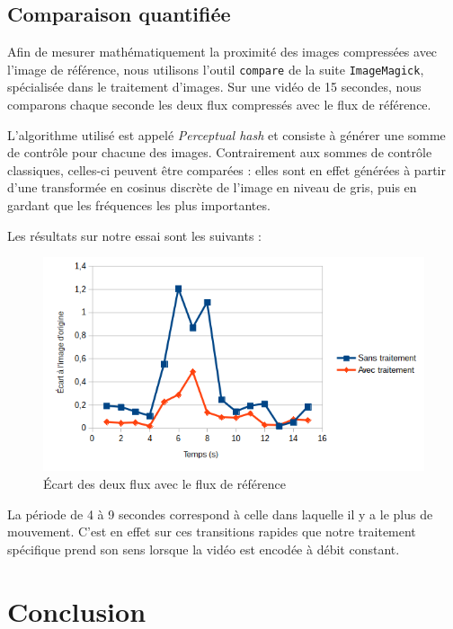 \documentclass[11pt,a4paper]{article}
\begin{document}
\subsection{Comparaison quantifiée}
Afin de mesurer mathématiquement la proximité des images compressées avec l'image de référence, nous utilisons l'outil \texttt{compare} de la suite \texttt{ImageMagick}, spécialisée dans le traitement d'images.
Sur une vidéo de 15 secondes, nous comparons chaque seconde les deux flux compressés avec le flux de référence.

\bigbreak
L'algorithme utilisé est appelé \textit{Perceptual hash} et consiste à générer une somme de contrôle pour chacune des images.
Contrairement aux sommes de contrôle classiques, celles-ci peuvent être comparées : elles sont en effet générées à partir d'une transformée en cosinus discrète de l'image en niveau de gris, puis en gardant que les fréquences les plus importantes.

\bigbreak
Les résultats sur notre essai sont les suivants :

\begin{figure}[H]
\begin{center}
\includegraphics[scale=0.6]{images/comparaison_imagemagick.png}
\end{center}
\caption{Écart des deux flux avec le flux de référence}
\label{}
\end{figure}

\bigbreak
La période de 4 à 9 secondes correspond à celle dans laquelle il y a le plus de mouvement.
C'est en effet sur ces transitions rapides que notre traitement spécifique prend son sens lorsque la vidéo est encodée à débit constant.


\section{Conclusion}
\end{document}

